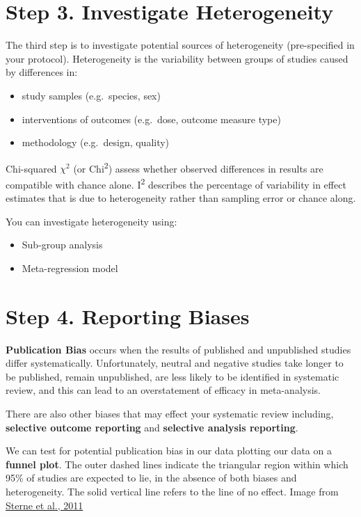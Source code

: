 \documentclass[
]{book}
\begin{document}
\hypertarget{step-3.-investigate-heterogeneity}{%
\section{Step 3. Investigate Heterogeneity}\label{step-3.-investigate-heterogeneity}}

The third step is to investigate potential sources of heterogeneity (pre-specified in your protocol). Heterogeneity is the variability between groups of studies caused by differences in:

\begin{itemize}
\item
  study samples (e.g.~species, sex)
\item
  interventions of outcomes (e.g.~dose, outcome measure type)
\item
  methodology (e.g.~design, quality)
\end{itemize}

Chi-squared \(\chi^2\) (or Chi\textsuperscript{2}) assess whether observed differences in results are compatible with chance alone.
I\textsuperscript{2} describes the percentage of variability in effect estimates that is due to heterogeneity rather than sampling error or chance along.

You can investigate heterogeneity using:

\begin{itemize}
\item
  Sub-group analysis
\item
  Meta-regression model
\end{itemize}

\hypertarget{step-4.-reporting-biases}{%
\section{Step 4. Reporting Biases}\label{step-4.-reporting-biases}}

\textbf{Publication Bias} occurs when the results of published and unpublished studies differ systematically. Unfortunately, neutral and negative studies take longer to be published, remain unpublished, are less likely to be identified in systematic review, and this can lead to an overstatement of efficacy in meta-analysis.

There are also other biases that may effect your systematic review including, \textbf{selective outcome reporting} and \textbf{selective analysis reporting}.

We can test for potential publication bias in our data plotting our data on a \textbf{funnel plot}.
The outer dashed lines indicate the triangular region within which 95\% of studies are expected to lie, in the absence of both biases and heterogeneity. The solid vertical line refers to the line of no effect. Image from \href{https://www.bmj.com/content/343/bmj.d4002}{Sterne et al., 2011}
\end{document}
